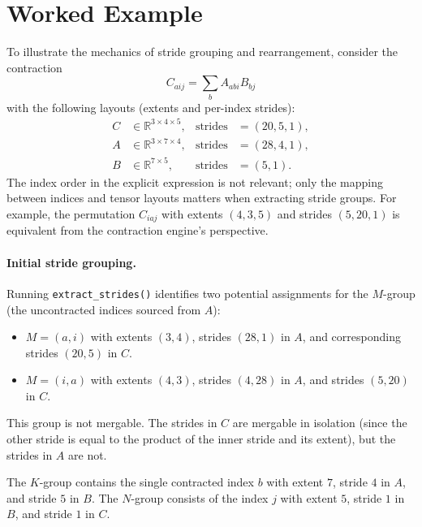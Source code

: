 \documentclass[11pt]{article}
\begin{document}
\section{Worked Example}
To illustrate the mechanics of stride grouping and rearrangement, consider the contraction
\begin{equation}
  C_{aij} = \sum_b A_{abi} B_{bj}
\end{equation}
with the following layouts (extents and per-index strides):
\begin{align*}
  C &\in \mathbb{R}^{3 \times 4 \times 5}, &\text{strides}&=(20, 5, 1), \\
  A &\in \mathbb{R}^{3 \times 7 \times 4}, &\text{strides}&=(28, 4, 1), \\
  B &\in \mathbb{R}^{7 \times 5},           &\text{strides}&=(5, 1).
\end{align*}
The index order in the explicit expression is not relevant; only the mapping between
indices and tensor layouts matters when extracting stride groups.  For example, the permutation
\(C_{iaj}\) with extents \((4, 3, 5)\) and strides \((5, 20, 1)\) is equivalent from the
contraction engine's perspective.

\paragraph{Initial stride grouping.}  Running \texttt{extract\_strides()} identifies two potential
assignments for the $M$-group (the uncontracted indices sourced from $A$):
\begin{itemize}
  \item $M = (a, i)$ with extents $(3, 4)$, strides $(28, 1)$ in $A$, and corresponding strides
        $(20, 5)$ in $C$.
  \item $M = (i, a)$ with extents $(4, 3)$, strides $(4, 28)$ in $A$, and strides $(5, 20)$ in $C$.
\end{itemize}
This group is not mergable. The strides in $C$ are mergable in isolation (since the other stride is equal
to the product of the inner stride and its extent), but the strides in $A$ are not.

The $K$-group contains the single contracted index $b$ with extent $7$, stride $4$ in
$A$, and stride $5$ in $B$. The $N$-group consists of the index $j$ with extent $5$, stride $1$ in
$B$, and stride $1$ in $C$.
\end{document}
